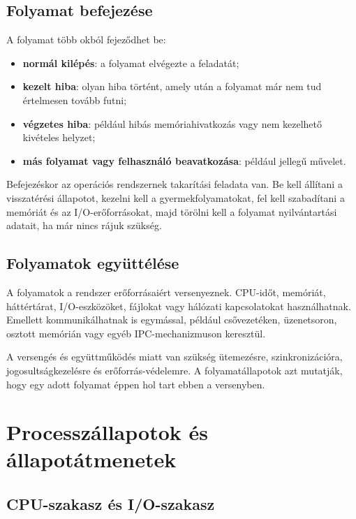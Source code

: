 \subsection{Folyamat befejezése}

A folyamat több okból fejeződhet be:

\begin{itemize}
  \item \textbf{normál kilépés}: a folyamat elvégezte a feladatát;
  \item \textbf{kezelt hiba}: olyan hiba történt, amely után a folyamat már nem tud értelmesen tovább futni;
  \item \textbf{végzetes hiba}: például hibás memóriahivatkozás vagy nem kezelhető kivételes helyzet;
  \item \textbf{más folyamat vagy felhasználó beavatkozása}: például  jellegű művelet.
\end{itemize}

Befejezéskor az operációs rendszernek takarítási feladata van. Be kell állítani a visszatérési állapotot, kezelni kell a gyermekfolyamatokat, fel kell szabadítani a memóriát és az I/O-erőforrásokat, majd törölni kell a folyamat nyilvántartási adatait, ha már nincs rájuk szükség.

\subsection{Folyamatok együttélése}

A folyamatok a rendszer erőforrásaiért versenyeznek. CPU-időt, memóriát, háttértárat, I/O-eszközöket, fájlokat vagy hálózati kapcsolatokat használhatnak. Emellett kommunikálhatnak is egymással, például csővezetéken, üzenetsoron, osztott memórián vagy egyéb IPC-mechanizmuson keresztül.

A versengés és együttműködés miatt van szükség ütemezésre, szinkronizációra, jogosultságkezelésre és erőforrás-védelemre. A folyamatállapotok azt mutatják, hogy egy adott folyamat éppen hol tart ebben a versenyben.

\section{Processzállapotok és állapotátmenetek}

\subsection{CPU-szakasz és I/O-szakasz}


